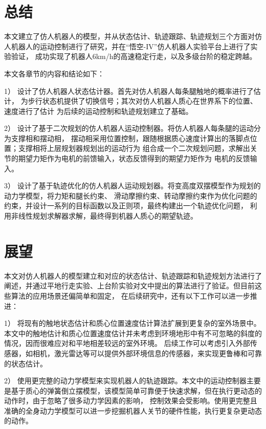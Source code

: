 \section{总结}

本文建立了仿人机器人的模型，并从状态估计、轨迹跟踪、轨迹规划三个方面对仿人机器人的运动控制进行了研究，并在“悟空-IV”仿人机器人实验平台上进行了实验验证，
成功实现了机器人6km/h的高速稳定行走，以及多级台阶的稳定跨越。

本文各章节的内容和结论如下：

1） 设计了仿人机器人状态估计器。首先对仿人机器人每条腿触地的概率进行了估计，
为步行状态机提供了切换信号；其次对仿人机器人质心在世界系下的位置、速度进行了估计
为后续的运动控制和轨迹规划建立了基础。

2） 设计了基于二次规划的仿人机器人运动控制器。将仿人机器人每条腿的运动分为支撑相和摆动相，
摆动相采用位置控制，跟随根据质心速度计算出的落脚点位置；支撑相将上层规划器规划出的运动行为
组合成一个二次规划问题，求解出关节的期望力矩作为电机的前馈输入，状态反馈得到的期望力矩作为
电机的反馈输入。

3） 设计了基于轨迹优化的仿人机器人运动规划器。将变高度双摆模型作为规划的动力学模型，将力矩和腿长约束、
滑动摩擦约束、转动摩擦约束作为优化问题的约束，并设计一系列的目标函数以及正则项，最终构建出一个轨迹优化问题，
利用非线性规划求解器求解，最终得到机器人质心的期望轨迹。
\section{展望}

本文对仿人机器人的模型建立和对应的状态估计、轨迹跟踪和轨迹规划方法进行了阐述，并通过平地行走实验、上台阶实验对文中提出的算法进行了验证。但目前这些算法的应用场景还偏简单和固定，
在后续研究中，还有以下工作可以进一步推进：

1） 将现有的触地状态估计和质心位置速度估计算法扩展到更复杂的室外场景中。本文中的触地估计和质心位置速度估计并未考虑到环境地形中有不可忽略的斜度的情况，因而很难应对和平地相差较远的室外环境。
后续工作可以考虑引入外部传感器，如相机，激光雷达等可以提供外部环境信息的传感器，来实现更鲁棒和可靠的状态估计。

2） 使用更完整的动力学模型来实现机器人的轨迹跟踪。本文中的运动控制器主要是基于质心的弹簧倒立摆模型，该模型简单可靠便于快速求解，但在执行更动态的动作时，由于忽略了很多动力学因素的影响，
控制效果会受影响。使用更完整且准确的全身动力学模型可以进一步挖掘机器人关节的硬件性能，执行更复杂更动态的动作。

